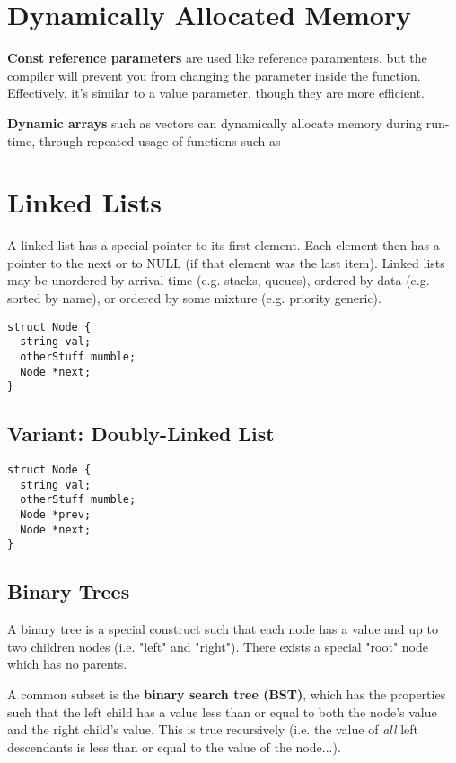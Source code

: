 \documentclass[12pt]{article}
\begin{document}
\section*{Dynamically Allocated Memory}
{\bf Const reference parameters} are used like reference paramenters, but the compiler will prevent you from changing the parameter inside the function. Effectively, it's similar to a value parameter, though they are more efficient.

{\bf Dynamic arrays} such as vectors can dynamically allocate memory during run-time, through repeated usage of functions such as 

\section*{Linked Lists}
A linked list has a special pointer to its first element. Each element then has a pointer to the next or to NULL (if that element was the last item). Linked lists may be unordered by arrival time (e.g. stacks, queues), ordered by data (e.g. sorted by name), or ordered by some mixture (e.g. priority generic).

\begin{verbatim}
struct Node {
  string val;
  otherStuff mumble;
  Node *next;
}
\end{verbatim}

\subsection*{Variant: Doubly-Linked List}
\begin{verbatim}
struct Node {
  string val;
  otherStuff mumble;
  Node *prev;
  Node *next;
}
\end{verbatim}

\subsection*{Binary Trees}
A binary tree is a special construct such that each node has a value and up to two children nodes (i.e. "left" and "right"). There exists a special "root" node which has no parents.

A common subset is the {\bf binary search tree (BST)}, which has the properties such that the left child has a value less than or equal to both the node's value and the right child's value. This is true recursively (i.e. the value of {\it all} left descendants is less than or equal to the value of the node...).
\end{document}
